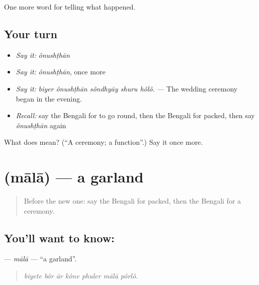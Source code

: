 \begin{grammarlens}[title={What you've built}]
One more word for telling what happened.
\end{grammarlens}

\subsection*{Your turn}
\begin{itemize}
\raggedright
  \item \emph{Say it:} \emph{ônushṭhān}
  \item \emph{Say it:} \emph{ônushṭhān}, once more
  \item \emph{Say it:} \emph{biyer ônushṭhān sôndhyāy shuru hôlô.} — The wedding ceremony began in the evening.
  \item \emph{Recall:} say the Bengali for to go round, then the Bengali for packed, then say \emph{ônushṭhān} again
\end{itemize}

\begin{tcolorbox}[breakable,colback=teal!4,colframe=teal!35!black,title={Before you move on}]
What does  mean? (\textquotedblleft{}A ceremony; a function\textquotedblright{}.) Say it once more.
\end{tcolorbox}
\section[\texorpdfstring{\bn{মালা} (mālā)}{মালা (mālā)}]{ (mālā) — a garland}

\label{lesson:BN-C312-mala}



\begin{quote}
Before the new one: say the Bengali for packed, then the Bengali for a ceremony.
\end{quote}

\subsection*{You'll want to know: }
\textbf{} — \emph{mālā} — \textquotedblleft{}a garland\textquotedblright{}.

\begin{quote}
      
\end{quote}

\begin{quote}
\emph{biyete bôr ār kône phuler mālā pôrlô.}
\end{quote}

